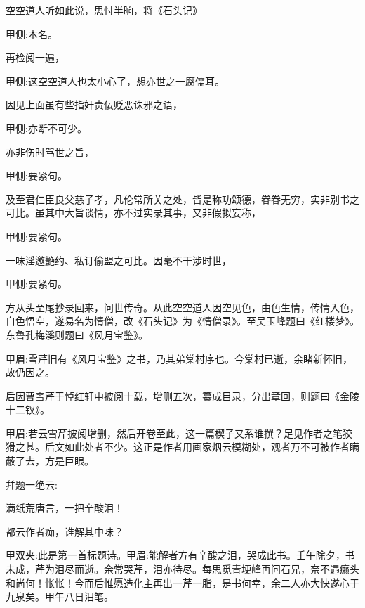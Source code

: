 \begin{parag}
    空空道人听如此说，思忖半晌，将《石头记》\begin{note}甲侧:本名。\end{note}再检阅一遍，\begin{note}甲侧:这空空道人也太小心了，想亦世之一腐儒耳。\end{note}因见上面虽有些指奸责佞贬恶诛邪之语，\begin{note}甲侧:亦断不可少。\end{note}亦非伤时骂世之旨，\begin{note}甲侧:要紧句。\end{note}及至君仁臣良父慈子孝，凡伦常所关之处，皆是称功颂德，眷眷无穷，实非别书之可比。虽其中大旨谈情，亦不过实录其事，又非假拟妄称，\begin{note}甲侧:要紧句。\end{note}一味淫邀艶约、私订偷盟之可比。因毫不干涉时世，\begin{note}甲侧:要紧句。\end{note}方从头至尾抄录回来，问世传奇。从此空空道人因空见色，由色生情，传情入色，自色悟空，遂易名为情僧，改《石头记》为《情僧录》。至吴玉峰题曰《红楼梦》。东鲁孔梅溪则题曰《风月宝鉴》。\begin{note}甲眉:雪芹旧有《风月宝鉴》之书，乃其弟棠村序也。今棠村已逝，余睹新怀旧，故仍因之。\end{note}后因曹雪芹于悼红轩中披阅十载，增删五次，纂成目录，分出章回，则题曰《金陵十二钗》。\begin{note}甲眉:若云雪芹披阅增删，然后开卷至此，这一篇楔子又系谁撰？足见作者之笔狡猾之甚。后文如此处者不少。这正是作者用画家烟云模糊处，观者万不可被作者瞒蔽了去，方是巨眼。\end{note}幷题一绝云:
\end{parag}


\begin{poem}
    \begin{pl}满纸荒唐言，一把辛酸泪！\end{pl}

    \begin{pl}都云作者痴，谁解其中味？\end{pl}
    \begin{note}甲双夹:此是第一首标题诗。甲眉:能解者方有辛酸之泪，哭成此书。壬午除夕，书未成，芹为泪尽而逝。余常哭芹，泪亦待尽。每思觅青埂峰再问石兄，奈不遇癞头和尚何！怅怅！今而后惟愿造化主再出一芹一脂，是书何幸，余二人亦大快遂心于九泉矣。甲午八日泪笔。\end{note}
\end{poem}


